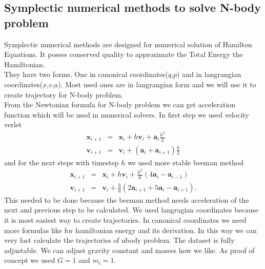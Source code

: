 \subsection{Symplectic numerical methods to solve N-body problem}
Symplectic numerical methods are designed for numerical solution of Hamilton Equations. It posses conserved quality to approximate the Total Energy the Hamiltonian.\\
They have two forms. One in canonical coordinates($q$,$p$) and in langrangian coordinates($x$,$v$,$a$). Most used ones are in langrangian form and we will use it to create trajectory for N-body problem.\\
From the Newtonian formula for N-body problem we can get acceleration function which will be used in numerical solvers. In first step we used velocity verlet
\begin{eqnarray}
	\mathbf{x}_{i+1} &=& \mathbf{x}_i + h\mathbf{v}_i + \mathbf{a}_i\frac{h^2}{2} \\
	\mathbf{v}_{i+1}&=&\mathbf{v}_i + (\mathbf{a}_i +\mathbf{a}_{i+1})\frac{h}{2}
\end{eqnarray} and
for the next steps with timestep $h$ we used more stable beeman method
\begin{eqnarray}
	\mathbf{x}_{i+1} &=& \mathbf{x}_i + h\mathbf{v}_i + \frac{h^2}{6}(4\mathbf{a}_{i}-\mathbf{a}_{i-1})\\
	\mathbf{v}_{i+1}&=&\mathbf{v}_i + \frac{h}{6}(2\mathbf{a}_{i+1} + 5\mathbf{a}_i-\mathbf{a}_{i+1}).
\end{eqnarray}
This needed to be done because the beeman method needs acceleration of the next and previous step to be calculated. We used langragian coordinates because it is most easiest way to create trajectories.
In canonical coordinates we need more formulas like for hamiltonian energy and its derivation. In this way we can very fast calculate the trajectories of nbody problem. The dataset is fully adjustable. We can adjust gravity constant and masses how we like. As proof of concept we used $G=1$ and $m_i=1$.  


